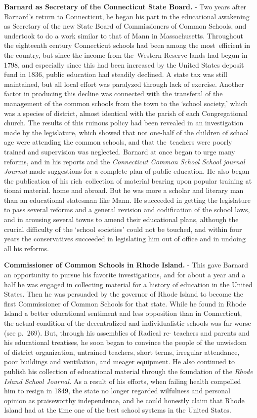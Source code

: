 \documentclass[]{book}
\begin{document}
\textbf{Barnard as Secretary of the Connecticut State Board.} - Two years after Barnard's return to Connecticut, he began his part in the educational awakening as Secretary of the new State Board of Commissioners of Common Schools, and undertook to do a work similar to that of Mann in Massachusetts. Throughout the eighteenth century Connecticut schools had been among the most~efficient in the country, but since the income from the~Western Reserve lands had begun in 1798, and especially since this had been increased by the United States deposit fund in 1836, public education had steadily declined. A state tax was still maintained, but all local effort was paralyzed through lack of exercise. Another factor in producing this decline was connected with the transferal of the management of the common schools from the town to the `school society,' which was a species of district, almost identical with the parish of each Congregational church. The results of this ruinous policy had been revealed in an investigation made by the legislature, which showed that not one-half of the children of school age were attending the common schools, and that the~teachers were poorly trained and supervision was neglected. Barnard at once began to urge many reforms, and in his reports and the \emph{Connecticut Common School School journal Journal} made suggestions for a complete plan of public education. He also began the publication of his rich~collection of material bearing upon popular training at tionai material. home and abroad. But he was more a scholar and literary man than an educational statesman like Mann. He succeeded in getting the legislature to pass several reforms and a general revision and codification of the school laws, and in arousing several towns to amend their educational plans, although the crucial difficulty of the `school societies' could not be touched, and within four years the conservatives succeeded in legislating him out of office and in undoing all his reforms.

\textbf{Commissioner of Common Schools in Rhode Island.} - This gave Barnard an opportunity to pursue his favorite investigations, and for about a year and a half he was engaged in collecting material for a history of education in the United States. Then he was persuaded by the governor of Rhode Island to become the first Commissioner of Common Schools for that state. While he found in Rhode Island a better educational sentiment and less opposition than in Connecticut, the actual condition of the decentralized and individualistic schools was far worse (see p.~269). But, through his assemblies of Radical re- teachers and parents and his educational treatises, he soon began to convince the people of the unwisdom of district organization, untrained teachers, short terms, irregular attendance, poor buildings and ventilation, and meager equipment. He also continued to publish his collection of educational material through the foundation of the \emph{Rhode Island School Journal.} As a result of his efforts, when failing health compelled him to resign in 1849, the state no longer regarded wilfulness and personal opinion as praiseworthy independence, and he could honestly claim that Rhode Island had at the time one of the best school systems in the United States.
\end{document}

